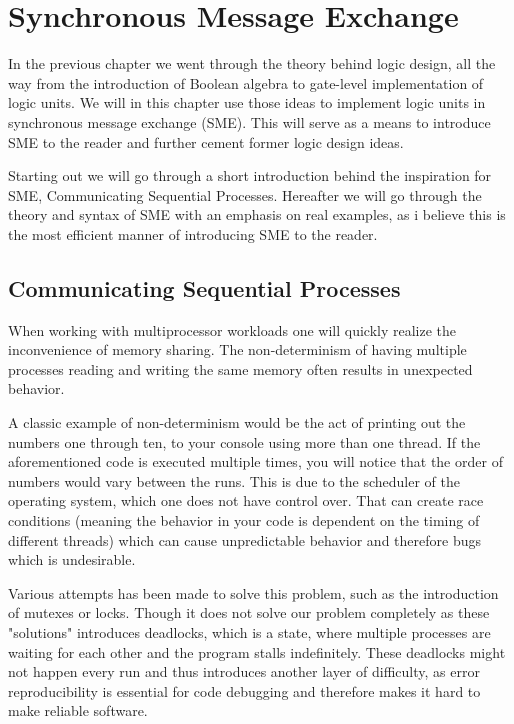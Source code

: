 \chapter{Synchronous Message Exchange}

In the previous chapter we went through the theory behind logic design, all the way from the introduction of Boolean algebra to gate-level implementation of logic units. We will in this chapter use those ideas to implement logic units in synchronous message exchange (SME). This will serve as a means to introduce SME to the reader and further cement former logic design ideas.

Starting out we will go through a short introduction behind the inspiration for SME, Communicating Sequential Processes. Hereafter we will go through the theory and syntax of SME with an emphasis on real examples, as i believe this is the most efficient manner of introducing SME to the reader.  

\section{Communicating Sequential Processes}  
    
    When working with multiprocessor workloads one will quickly realize the inconvenience of memory sharing. The non-determinism of having multiple processes reading and writing the same memory often results in unexpected behavior.
    
    A classic example of non-determinism would be the act of printing out the numbers one through ten, to your console using more than one thread. If the aforementioned code is executed multiple times, you will notice that the order of numbers would vary between the runs. This is due to the scheduler of the operating system, which one does not have control over. That can create race conditions (meaning the behavior in your code is dependent on the timing of different threads) which can cause unpredictable behavior and therefore bugs which is undesirable.
    
    Various attempts has been made to solve this problem, such as the introduction of mutexes or locks. Though it does not solve our problem completely as these "solutions" introduces deadlocks, which is a state, where multiple processes are waiting for each other and the program stalls indefinitely. These deadlocks might not happen every run and thus introduces another layer of difficulty, as error reproducibility is essential for code debugging and therefore makes it hard to make reliable software.
    
